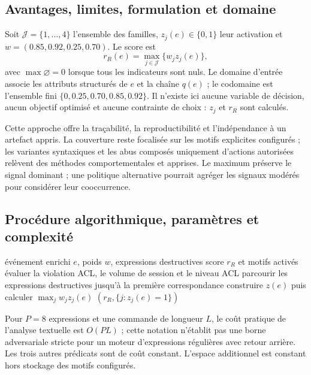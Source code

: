 \documentclass[11pt,a4paper,oneside]{report}
\theoremstyle{definition}
\theoremstyle{plain}
\begin{document}
\subsection*{Avantages, limites, formulation et domaine}

Soit $\mathcal{J}=\{1,\ldots,4\}$ l'ensemble des familles, $z_j(e)\in\{0,1\}$ leur activation et
$w=(0.85,0.92,0.25,0.70)$. Le score est
\begin{equation}
r_R(e)=\max_{j\in\mathcal{J}}\{w_jz_j(e)\},
\label{eq:ai-ro-rules}
\end{equation}
avec $\max\varnothing=0$ lorsque tous les indicateurs sont nuls. Le domaine d'entrée associe les attributs structurés de $e$ et la chaîne $q(e)$ ; le codomaine est l'ensemble fini $\{0,0.25,0.70,0.85,0.92\}$. Il n'existe ici aucune variable de décision, aucun objectif optimisé et aucune contrainte de choix : $z_j$ et $r_R$ sont calculés.

Cette approche offre la traçabilité, la reproductibilité et l'indépendance à un
artefact appris. La couverture reste focalisée sur les motifs explicites
configurés ; les variantes syntaxiques et les abus composés uniquement
d'actions autorisées relèvent des méthodes comportementales et apprises. Le
maximum préserve le signal dominant ; une politique alternative pourrait
agréger les signaux modérés pour considérer leur cooccurrence.

\subsection*{Procédure algorithmique, paramètres et complexité}

\begin{algorithm}[H]
\caption{Évaluation déterministe d'un événement}
\label{alg:ai-ro-rules}
\begin{algorithmic}[1]
\Require événement enrichi $e$, poids $w$, expressions destructives
\Ensure score $r_R$ et motifs activés
\State évaluer la violation ACL, le volume de session et le niveau ACL
\State parcourir les expressions destructives jusqu'à la première correspondance
\State construire $z(e)$ puis calculer $\max_j w_jz_j(e)$
\State \Return $(r_R,\{j:z_j(e)=1\})$
\end{algorithmic}
\end{algorithm}

Pour $P=8$ expressions et une commande de longueur $L$, le coût pratique de l'analyse textuelle est $O(PL)$ ; cette notation n'établit pas une borne adversariale stricte pour un moteur d'expressions régulières avec retour arrière. Les trois autres prédicats sont de coût constant. L'espace additionnel est constant hors stockage des motifs configurés.
\end{document}
